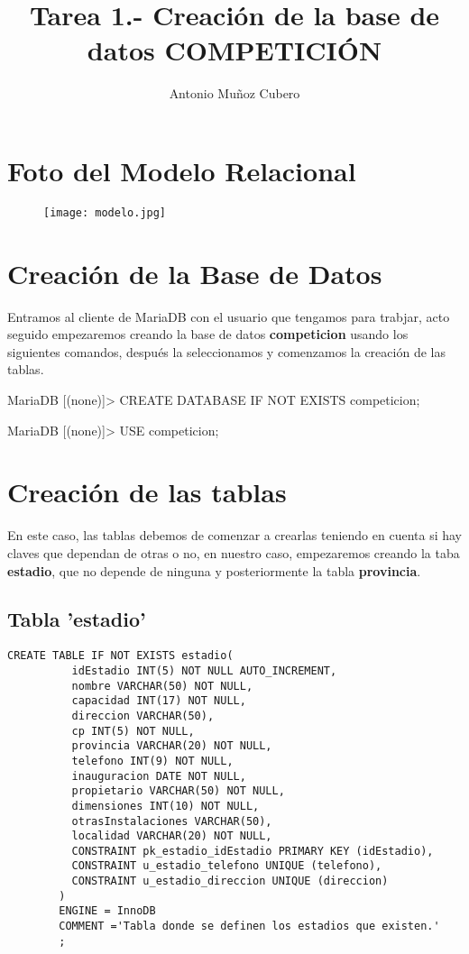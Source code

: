 \documentclass{article}
\title{Tarea 1.- Creación de la base de datos \textbf{COMPETICIÓN}}
\author{Antonio Muñoz Cubero}
\begin{document}
  \maketitle
      \pagestyle{fancy} 

\newpage
  \tableofcontents

\newpage
  \section{Foto del Modelo Relacional}
    \begin{figure}[h]
      \centering
      \texttt{[image: modelo.jpg]}
    \end{figure}

\newpage
  \section{Creación de la Base de Datos}
    Entramos al cliente de MariaDB con el usuario que tengamos para trabjar, acto seguido empezaremos creando 
    la base de datos \textbf{competicion} usando los siguientes comandos, después la seleccionamos y comenzamos la creación de las tablas. 
    \begin{listing}[style=consola, numbers=none]
    MariaDB [(none)]> CREATE DATABASE IF NOT EXISTS competicion;

    MariaDB [(none)]> USE competicion;

    \end{listing}

  \section{Creación de las tablas}
    En este caso, las tablas debemos de comenzar a crearlas teniendo en cuenta si hay claves que dependan de otras o no, en nuestro caso, empezaremos creando 
    la taba \textbf{estadio}, que no depende de ninguna y posteriormente la tabla \textbf{provincia}.
    \subsection{Tabla 'estadio'}
      \begin{lstlisting}[style=C]
        CREATE TABLE IF NOT EXISTS estadio(
          idEstadio INT(5) NOT NULL AUTO_INCREMENT,
          nombre VARCHAR(50) NOT NULL,
          capacidad INT(17) NOT NULL,
          direccion VARCHAR(50),
          cp INT(5) NOT NULL,
          provincia VARCHAR(20) NOT NULL,
          telefono INT(9) NOT NULL,
          inauguracion DATE NOT NULL,
          propietario VARCHAR(50) NOT NULL,
          dimensiones INT(10) NOT NULL,
          otrasInstalaciones VARCHAR(50),
          localidad VARCHAR(20) NOT NULL,
          CONSTRAINT pk_estadio_idEstadio PRIMARY KEY (idEstadio),
          CONSTRAINT u_estadio_telefono UNIQUE (telefono),
          CONSTRAINT u_estadio_direccion UNIQUE (direccion)
        )
        ENGINE = InnoDB
        COMMENT ='Tabla donde se definen los estadios que existen.'
        ;
      \end{lstlisting}
\end{document}
